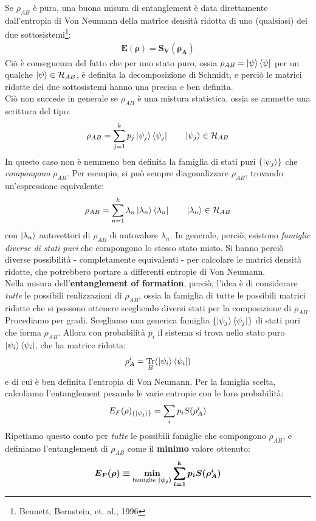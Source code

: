 \documentclass[../../InformazioneQuantistica.tex]{subfiles}
\begin{document}
Se $\rho_{AB}$ è pura, una buona misura di entanglement è data direttamente dall'entropia di Von Neumann della matrice densità ridotta di uno (qualsiasi) dei due sottosistemi\footnote{Bennett, Bernstein, et. al., 1996}:
\begin{align*}
\bm{E(\rho) = S_V(\rho_A)}
\end{align*}
Ciò è conseguenza del fatto che per uno stato puro, ossia $\rho_{AB} = \Ket{\psi}\Bra{\psi}$ per un qualche $\Ket{\psi} \in \mathcal{H}_{AB}$, è definita la decomposizione di Schmidt, e perciò le matrici ridotte dei due sottosistemi hanno una  precisa e ben definita.\\  
Ciò non succede in generale se $\rho_{AB}$ è una mistura statistica, ossia se ammette una scrittura del tipo:
\begin{align*}
    \rho_{AB} = \sum_{j=1}^k p_j \Ket{\psi_j}\Bra{\psi_j} \qquad \Ket{\psi_j} \in \mathcal{H}_{AB}
\end{align*}
In questo caso non è nemmeno ben definita la famiglia di stati puri $\{\Ket{\psi_j}\}$ che \textit{compongono} $\rho_{AB}$. Per esempio, si può sempre diagonalizzare $\rho_{AB}$, trovando un'espressione equivalente:
\begin{align*}
    \rho_{AB} = \sum_{n=1}^k \lambda_n \Ket{\lambda_n}\Bra{\lambda_n} \qquad \Ket{\lambda_n} \in \mathcal{H}_{AB}
\end{align*}
con $\Ket{\lambda_n}$ autovettori di $\rho_{AB}$ di autovalore $\lambda_n$. In generale, perciò, esistono \textit{famiglie diverse di stati puri} che compongono lo stesso stato misto. Si hanno perciò diverse possibilità - completamente equivalenti - per calcolare le matrici densità ridotte, che potrebbero portare a differenti entropie di Von Neumann.\\
Nella misura dell'\textbf{entanglement of formation}, perciò, l'idea è di considerare \textit{tutte} le possibili realizzazioni di $\rho_{AB}$, ossia la famiglia di tutte le possibili matrici ridotte che si possono ottenere scegliendo diversi stati per la composizione di $\rho_{AB}$.\\
Procediamo per gradi. Scegliamo una generica famiglia $\{\Ket{\psi_j}\Bra{\psi_j}\}$ di stati puri che forma $\rho_{AB}$. Allora con probabilità $p_i$ il sistema si trova nello stato puro $\Ket{\psi_i}\Bra{\psi_i}$, che ha matrice ridotta:
\begin{align*}
    \rho_A^i = \underset{B}{\operatorname{Tr}}(\Ket{\psi_i}\Bra{\psi_i})
\end{align*}
e di cui è ben definita l'entropia di Von Neumann. Per la famiglia scelta, calcoliamo l'entanglement pesando le varie entropie con le loro probabilità:
\begin{align*}
    E_F(\rho)_{\{\Ket{\psi_j}\}} = \sum_i p_i S(\rho_A^i)
\end{align*}
Ripetiamo questo conto per \textit{tutte} le possibili famiglie che compongono $\rho_{AB}$, e definiamo l'entanglement di $\rho_{AB}$ come il \textbf{minimo} valore ottenuto:
\begin{align*}
    \bm{E_F(\rho) \equiv \min_{\text{famiglie } \Ket{\psi_j}} \sum_{i=1}^k p_i S(\rho_A^i)} 
\end{align*}
\end{document}
